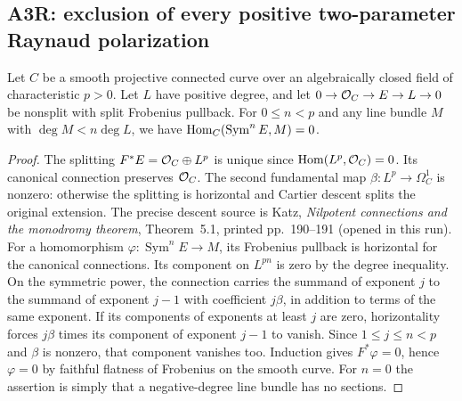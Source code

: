 \subsection{A3R: exclusion of every positive two-parameter Raynaud polarization}
\begin{lemma}\label{a:connection-bound}
Let $C$ be a smooth projective connected curve over an algebraically closed
field of characteristic $p>0$. Let $L$ have positive degree, and let
$0\to\mathcal O_C\to E\to L\to0$ be nonsplit with split Frobenius pullback.
For $0\leq n<p$ and any line bundle $M$ with
$\deg M<n\deg L$, we have $\operatorname{Hom}_C(\operatorname{Sym}^n E,M)=0$.
\end{lemma}
\begin{proof}
The splitting $F^*E=\mathcal O_C\oplus L^p$ is unique since
$\operatorname{Hom}(L^p,\mathcal O_C)=0$. Its canonical connection preserves $\mathcal O_C$.
The second fundamental map $\beta:L^p\to\Omega_C^1$ is nonzero:
otherwise the splitting is horizontal and Cartier descent splits the
original extension. The precise descent source is Katz, \emph{Nilpotent
connections and the monodromy theorem}, Theorem~5.1, printed pp.~190--191 (opened in this run).
For a homomorphism $\varphi:\operatorname{Sym}^nE\to M$, its Frobenius
pullback is horizontal for the canonical connections. Its component on
$L^{pn}$ is zero by the degree inequality. On the symmetric power, the
connection carries the summand of exponent $j$ to the summand of exponent
$j-1$ with coefficient $j\beta$, in addition to terms of the same exponent.
If its components of exponents at least $j$ are zero, horizontality forces
$j\beta$ times its component of exponent $j-1$ to vanish. Since
$1\leq j\leq n<p$ and $\beta$ is nonzero, that component vanishes too.
Induction gives $F^*\varphi=0$, hence $\varphi=0$ by faithful flatness of
Frobenius on the smooth curve. For $n=0$ the assertion is simply that a
negative-degree line bundle has no sections.
\end{proof}

